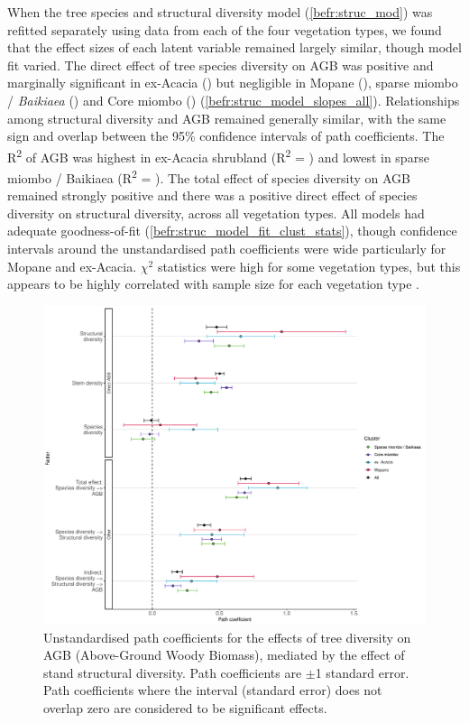 \begin{refsection}
When the tree species and structural diversity model (\autoref{befr:struc_mod}) was refitted separately using data from each of the four vegetation types, we found that the effect sizes of each latent variable remained largely similar, though model fit varied. The direct effect of tree species diversity on AGB was positive and marginally significant in ex-Acacia (\strucbetacsb{}) but negligible in Mopane (\strucbetadsb{}), sparse miombo / \textit{Baikiaea} (\strucbetaasb{}) and Core miombo (\strucbetabsb{}) (\autoref{befr:struc_model_slopes_all}). Relationships among structural diversity and AGB remained generally similar, with the same sign and overlap between the 95\% confidence intervals of path coefficients. The R\textsuperscript{2} of AGB was highest in ex-Acacia shrubland (R\textsuperscript{2} = \struccrsq{}) and lowest in sparse miombo / Baikiaea (R\textsuperscript{2} = \strucarsq{}). The total effect of species diversity on AGB remained strongly positive and there was a positive direct effect of species diversity on structural diversity, across all vegetation types. All models had adequate goodness-of-fit (\autoref{befr:struc_model_fit_clust_stats}), though confidence intervals around the unstandardised path coefficients were wide particularly for Mopane and ex-Acacia. $\chi^{2}$ statistics were high for some vegetation types, but this appears to be highly correlated with sample size for each vegetation type \citep{Hooper2008}.

\begin{figure}[tb]
\centering
	\includegraphics[width=\textwidth]{img/struc_model_slopes_all}
	\caption[Path coefficients for vegetation type model]{Unstandardised path coefficients for the effects of tree diversity on AGB (Above-Ground Woody Biomass), mediated by the effect of stand structural diversity. Path coefficients are $\pm$1 standard error. Path coefficients where the interval (standard error) does not overlap zero are considered to be significant effects.}
	\label{befr:struc_model_slopes_all}
\end{figure}


\end{refsection}
